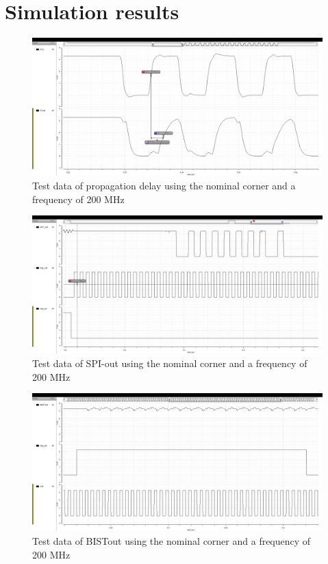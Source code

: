 \section{Simulation results}
\label{app:simulations}

\begin{figure}[H]
	\centering
	\captionsetup{justification=centering}
	\includegraphics[angle=90, scale=0.35]{../figures/cm_200_cin_cout.png}
	\caption{Test data of propagation delay using the nominal corner and a frequency of 200 MHz}
\end{figure}

\begin{figure}[H]
	\centering
	\captionsetup{justification=centering}
	\includegraphics[angle=90, scale=0.35]{../figures/cm_200_spi_out.png}
	\caption{Test data of SPI-out using the nominal corner and a frequency of 200 MHz} 
\end{figure}

\begin{figure}[H]
  \centering
  \captionsetup{justification=centering}
  \includegraphics[angle=90, scale=0.35]{../figures/cm_200_bistout.png}
  \caption{Test data of BISTout using the nominal corner and a frequency of 200 MHz} 
\end{figure}

